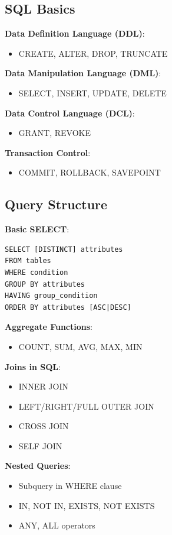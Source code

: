 \documentclass[12pt,a4paper]{report}
\begin{document}
\subsection{SQL Basics}
\begin{concept}
\textbf{Data Definition Language (DDL)}:
\begin{itemize}
    \item CREATE, ALTER, DROP, TRUNCATE
\end{itemize}

\textbf{Data Manipulation Language (DML)}:
\begin{itemize}
    \item SELECT, INSERT, UPDATE, DELETE
\end{itemize}

\textbf{Data Control Language (DCL)}:
\begin{itemize}
    \item GRANT, REVOKE
\end{itemize}

\textbf{Transaction Control}:
\begin{itemize}
    \item COMMIT, ROLLBACK, SAVEPOINT
\end{itemize}
\end{concept}

\subsection{Query Structure}
\begin{concept}
\textbf{Basic SELECT}:
\begin{verbatim}
SELECT [DISTINCT] attributes
FROM tables
WHERE condition
GROUP BY attributes
HAVING group_condition
ORDER BY attributes [ASC|DESC]
\end{verbatim}

\textbf{Aggregate Functions}:
\begin{itemize}
    \item COUNT, SUM, AVG, MAX, MIN
\end{itemize}

\textbf{Joins in SQL}:
\begin{itemize}
    \item INNER JOIN
    \item LEFT/RIGHT/FULL OUTER JOIN
    \item CROSS JOIN
    \item SELF JOIN
\end{itemize}

\textbf{Nested Queries}:
\begin{itemize}
    \item Subquery in WHERE clause
    \item IN, NOT IN, EXISTS, NOT EXISTS
    \item ANY, ALL operators
\end{itemize}
\end{concept}
\end{document}
